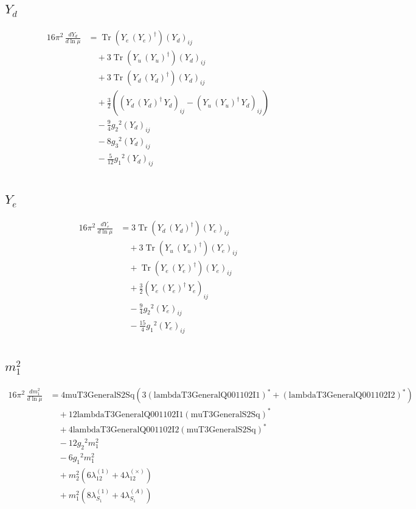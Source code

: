 \documentclass[10pt,a4paper]{article}
\begin{document}
\subsection*{$Y_d$}
\begin{align*}
16\pi^2\,\frac{d Y_d}{d\ln\mu} &=\operatorname{Tr}\!\left({Y_e}\,\left({Y_e}\right)^{\dagger}\right) \left({Y_d}\right)_{ij} \\
&\quad +3 \operatorname{Tr}\!\left({Y_u}\,\left({Y_u}\right)^{\dagger}\right) \left({Y_d}\right)_{ij} \\
&\quad +3 \operatorname{Tr}\!\left({Y_d}\,\left({Y_d}\right)^{\dagger}\right) \left({Y_d}\right)_{ij} \\
&\quad +\frac{3}{2} (\left({Y_d}\,\left({Y_d}\right)^{\dagger}\,{Y_d}\right)_{ij}-\left({Y_u}\,\left({Y_u}\right)^{\dagger}\,{Y_d}\right)_{ij}) \\
&\quad -\frac{9}{4} {g_2}^2 \left({Y_d}\right)_{ij} \\
&\quad -8 {g_3}^2 \left({Y_d}\right)_{ij} \\
&\quad -\frac{5}{12} {g_1}^2 \left({Y_d}\right)_{ij} \\
\end{align*}
\subsection*{$Y_e$}
\begin{align*}
16\pi^2\,\frac{d Y_e}{d\ln\mu} &=3 \operatorname{Tr}\!\left({Y_d}\,\left({Y_d}\right)^{\dagger}\right) \left({Y_e}\right)_{ij} \\
&\quad +3 \operatorname{Tr}\!\left({Y_u}\,\left({Y_u}\right)^{\dagger}\right) \left({Y_e}\right)_{ij} \\
&\quad +\operatorname{Tr}\!\left({Y_e}\,\left({Y_e}\right)^{\dagger}\right) \left({Y_e}\right)_{ij} \\
&\quad +\frac{3}{2} \left({Y_e}\,\left({Y_e}\right)^{\dagger}\,{Y_e}\right)_{ij} \\
&\quad -\frac{9}{4} {g_2}^2 \left({Y_e}\right)_{ij} \\
&\quad -\frac{15}{4} {g_1}^2 \left({Y_e}\right)_{ij} \\
\end{align*}
\subsection*{$m_1^2$}
\begin{align*}
16\pi^2\,\frac{d m_1^2}{d\ln\mu} &=4 \text{muT3GeneralS2Sq} (3 \left(\text{lambdaT3GeneralQ001102I1}\right)^{*}+\left(\text{lambdaT3GeneralQ001102I2}\right)^{*}) \\
&\quad +12 \text{lambdaT3GeneralQ001102I1} \left(\text{muT3GeneralS2Sq}\right)^{*} \\
&\quad +4 \text{lambdaT3GeneralQ001102I2} \left(\text{muT3GeneralS2Sq}\right)^{*} \\
&\quad -12 {g_2}^2 {m_1^2} \\
&\quad -6 {g_1}^2 {m_1^2} \\
&\quad +{m_2^2} (6 {\lambda_{12}^{(1)}}+4 {\lambda_{12}^{(\times)}}) \\
&\quad +{m_1^2} (8 {\lambda_{S_1}^{(1)}}+4 {\lambda_{S_1}^{(A)}}) \\
\end{align*}
\end{document}
